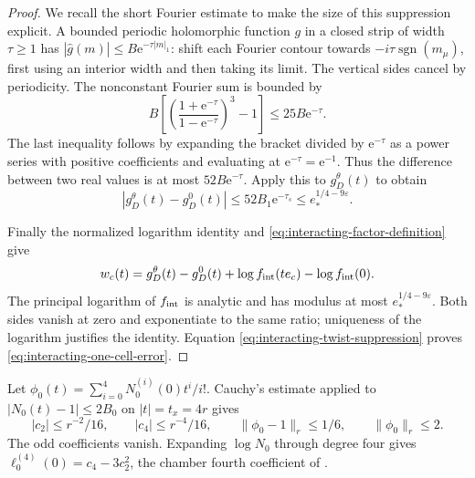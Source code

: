 \begin{proof}
We recall the short Fourier estimate to make the
size of this suppression explicit. A bounded
periodic holomorphic function $g$ in a closed
strip of width $\tau\ge1$ has
$|\widehat g(m)|\le B \mathrm e^{-\tau|m|_1}$:
shift each Fourier contour towards
$-i\tau\operatorname{sgn}(m_\mu)$, first using
an interior width and then taking its limit.
The vertical sides cancel by periodicity.
The nonconstant Fourier sum is bounded by
\[
 B\left[\left(\frac{1+\mathrm e^{-\tau}}{1-\mathrm e^{-\tau}}\right)^3-1\right]
                                      \le25B\mathrm e^{-\tau}.
\]
The last inequality follows by expanding the
bracket divided by $\mathrm e^{-\tau}$ as a power
series with positive coefficients and evaluating
at $\mathrm e^{-\tau}=\mathrm e^{-1}$. Thus the difference
between two real values is at most $52B\mathrm e^{-\tau}$.
Apply this to $g_D^\theta(t)$ to obtain
\begin{equation}\label{eq:interacting-twist-suppression}
 |g_D^\theta(t)-g_D^0(t)|\le52B_1\mathrm e^{-\tau_s}
                                  \le e_*^{1/4-9\varepsilon}.
\end{equation}

Finally the normalized logarithm identity and
\eqref{eq:interacting-factor-definition} give
\[
 w_c(t)=g_D^\theta(t)-g_D^0(t)
                +\log f_{\rm int}(te_c)-\log f_{\rm int}(0).
\]
The principal logarithm of $f_{\rm int}$ is
analytic and has modulus at most
$e_*^{1/4-9\varepsilon}$. Both sides vanish
at zero and exponentiate to the same ratio;
uniqueness of the logarithm justifies the
identity. Equation
\eqref{eq:interacting-twist-suppression} proves
\eqref{eq:interacting-one-cell-error}.
\end{proof}

Let $\phi_0(t)=\sum_{i=0}^4N_0^{(i)}(0)t^i/i!$.
Cauchy's estimate applied to
$|N_0(t)-1|\le2B_0$ on $|t|=t_x=4r$ gives
\begin{equation}\label{eq:interacting-free-jet}
 |c_2|\le r^{-2}/16,\qquad |c_4|\le r^{-4}/16,\qquad
 \|\phi_0-1\|_r\le1/6,\qquad \|\phi_0\|_r\le2.
\end{equation}
The odd coefficients vanish. Expanding $\log N_0$
through degree four gives
$\ell_0^{(4)}(0)=c_4-3c_2^2$, the chamber fourth coefficient
of \cite[Theorem~B]{PositiveProbe}.


